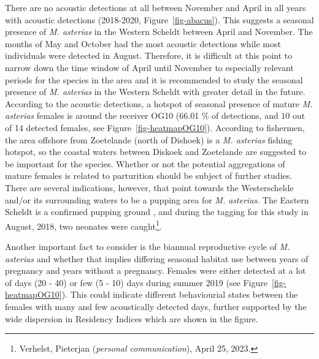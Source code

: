 \documentclass[
  authoryear,
  review,
  3p]{elsarticle}
\begin{document}
There are no acoustic detections at all between November and April in
all years with acoustic detections (2018-2020, Figure~\ref{fig-abacus}).
This suggests a seasonal presence of \emph{M. asterias} in the Western
Scheldt between April and November. The months of May and October had
the most acoustic detections while most individuals were detected in
August. Therefore, it is difficult at this point to narrow down the time
window of April until November to especially relevant periods for the
species in the area and it is recommended to study the seasonal presence
of \emph{M. asterias} in the Western Scheldt with greater detail in the
future. According to the acoustic detections, a hotspot of seasonal
presence of mature \emph{M. asterias} females is around the receiver
OG10 (66.01 \% of detections, and 10 out of 14 detected females, see
Figure~\ref{fig-heatmapOG10}). According to fishermen, the area offshore
from Zoetelande (north of Dishoek) is a \emph{M. asterias} fishing
hotspot, so the coastal waters between Diskoek and Zoetelande are
suggested to be important for the species. Whether or not the potential
aggregations of mature females is related to parturition should be
subject of further studies. There are several indications, however, that
point towards the Westerschelde and/or its surrounding waters to be a
pupping area for \emph{M. asterias}. The Eastern Scheldt is a confirmed
pupping ground \citep{breve_2016}, and during the tagging for this study
in August, 2018, two neonates \citep[around 30 cm TL,][]{farrell_2010}
were caught\footnote{Verhelst, Pieterjan (\emph{personal
  communication}), April 25, 2023.}.

Another important fact to consider is the biannual reproductive cycle of
\emph{M. asterias} and whether that implies differing seasonal habitat
use between years of pregnancy and years without a pregnancy. Females
were either detected at a lot of days (20 - 40) or few (5 - 10) days
during summer 2019 (see Figure~\ref{fig-heatmapOG10}). This could
indicate different behaviourial states between the females with many and
few acoustically detected days, further supported by the wide dispersion
in Residency Indices which are shown in the figure.
\end{document}
